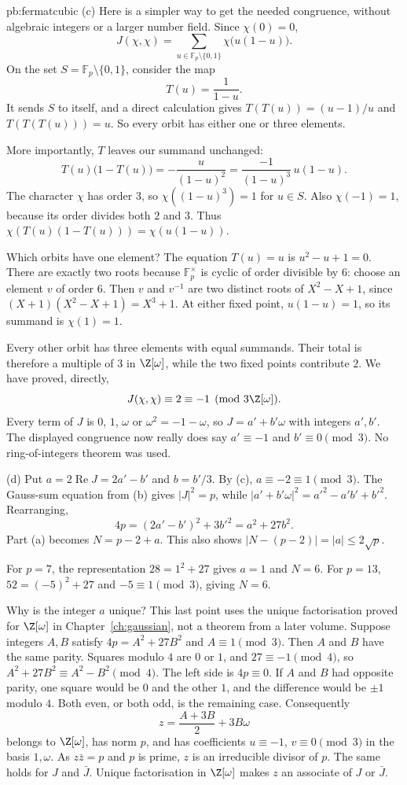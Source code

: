 \begin{solution}{pb:fermatcubic}
(c) Here is a simpler way to get the needed congruence,
without algebraic integers or a larger number field.
Since $\chi(0)=0$,
\[
J(\chi,\chi)=\sum_{u\in\mathbb F_p\setminus\{0,1\}}
                \chi\bigl(u(1-u)\bigr).
\]
On the set $S=\mathbb F_p\setminus\{0,1\}$,
consider the map
\[
T(u)=\frac1{1-u}.
\]
It sends $S$ to itself, and a direct calculation gives
$T(T(u))=(u-1)/u$ and $T(T(T(u)))=u$.
So every orbit has either one or three elements.

More importantly, $T$ leaves our summand unchanged:
\[
T(u)\bigl(1-T(u)\bigr)
=-\frac{u}{(1-u)^2}
=\frac{-1}{(1-u)^3}\,u(1-u).
\]
The character $\chi$ has order $3$, so
$\chi((1-u)^3)=1$ for $u\in S$.
Also $\chi(-1)=1$, because its order divides
both $2$ and $3$. Thus
$\chi(T(u)(1-T(u)))=\chi(u(1-u))$.

Which orbits have one element? The equation $T(u)=u$
is $u^2-u+1=0$. There are exactly two roots
because $\mathbb F_p^\times$ is cyclic of order divisible
by $6$: choose an element $v$ of order $6$.
Then $v$ and $v^{-1}$ are two distinct roots of
$X^2-X+1$, since $(X+1)(X^2-X+1)=X^3+1$.
At either fixed point, $u(1-u)=1$,
so its summand is $\chi(1)=1$.

Every other orbit has three elements with equal
summands. Their total is therefore a multiple
of $3$ in $\Z[\omega]$, while the two fixed points
contribute $2$. We have proved, directly,
\[
J(\chi,\chi)\equiv2\equiv-1\pmod{3\Z[\omega]}.
\]
Every term of $J$ is $0$, $1$, $\omega$ or
$\omega^2=-1-\omega$, so
$J=a'+b'\omega$ with integers $a',b'$.
The displayed congruence now really does say
$a'\equiv-1$ and $b'\equiv0\pmod3$.
No ring-of-integers theorem was used.


(d) Put $a=2\operatorname{Re}J=2a'-b'$ and $b=b'/3$. By (c), $a\equiv-2\equiv1\pmod3$. The Gauss-sum equation from (b) gives $|J|^2=p$, while
$|a'+b'\omega|^2=a'^2-a'b'+b'^2$. Rearranging,
\[
4p=(2a'-b')^2+3b'^2=a^2+27b^2.
\]
Part (a) becomes $N=p-2+a$. This also shows
$|N-(p-2)|=|a|\le2\sqrt p$.

For $p=7$, the representation $28=1^2+27$ gives
$a=1$ and $N=6$. For $p=13$,
$52=(-5)^2+27$ and $-5\equiv1\pmod3$, giving $N=6$.

Why is the integer $a$ unique? This last point uses the
unique factorisation proved for $\Z[\omega]$ in
Chapter~\ref{ch:gaussian}, not a theorem from a later volume.
Suppose integers $A,B$ satisfy
$4p=A^2+27B^2$ and $A\equiv1\pmod3$.
Then $A$ and $B$ have the same parity. Squares modulo $4$ are $0$ or $1$, and $27\equiv -1\pmod4$, so $A^2+27B^2\equiv A^2-B^2\pmod4$. The left side is $4p\equiv0$. If $A$ and $B$ had opposite parity, one square would be $0$ and the other $1$, and the difference would be $\pm1$ modulo $4$. Both even, or both odd, is the remaining case.
Consequently
\[
z=\frac{A+3B}{2}+3B\omega
\]
belongs to $\Z[\omega]$, has norm $p$, and has coefficients
$u\equiv-1$, $v\equiv0\pmod3$ in the basis $1,\omega$.
As $z\bar z=p$ and $p$ is prime, $z$ is an irreducible
divisor of $p$. The same holds for $J$ and $\bar J$.
Unique factorisation in $\Z[\omega]$ makes $z$ an
associate of $J$ or $\bar J$.


\end{solution}
